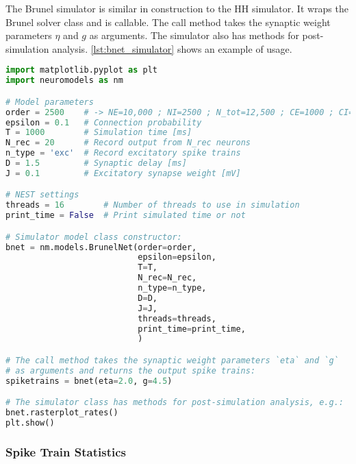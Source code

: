 The Brunel simulator is similar in construction to the HH simulator. It wraps the Brunel solver class and is callable. The call method takes the synaptic weight parameters $\eta$ and $g$ as arguments. The simulator also has methods for post-simulation analysis. \cref{lst:bnet_simulator} shows an example of usage.
\begin{lstlisting}[language=python, label={lst:bnet_simulator}, caption={Example usage of the Brunel simulator.}]
import matplotlib.pyplot as plt
import neuromodels as nm

# Model parameters
order = 2500    # -> NE=10,000 ; NI=2500 ; N_tot=12,500 ; CE=1000 ; CI=250
epsilon = 0.1   # Connection probability
T = 1000        # Simulation time [ms]
N_rec = 20      # Record output from N_rec neurons
n_type = 'exc'  # Record excitatory spike trains
D = 1.5         # Synaptic delay [ms]
J = 0.1         # Excitatory synapse weight [mV]

# NEST settings
threads = 16        # Number of threads to use in simulation
print_time = False  # Print simulated time or not

# Simulator model class constructor:
bnet = nm.models.BrunelNet(order=order,
                           epsilon=epsilon,
                           T=T,
                           N_rec=N_rec,
                           n_type=n_type,
                           D=D,
                           J=J,
                           threads=threads,
                           print_time=print_time,
                           )

# The call method takes the synaptic weight parameters `eta` and `g`
# as arguments and returns the output spike trains:
spiketrains = bnet(eta=2.0, g=4.5)

# The simulator class has methods for post-simulation analysis, e.g.:
bnet.rasterplot_rates()
plt.show()
\end{lstlisting}


\subsubsection*{Spike Train Statistics}

